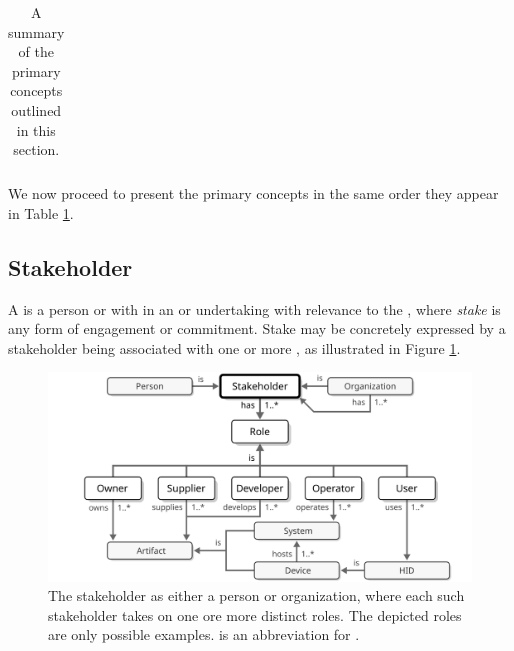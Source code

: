 \begin{table}[ht!]
\begin{tabularx}{\textwidth}{@{} p{0.2cm} p{0.7cm} p{4.3cm} X @{}}
\end{tabularx}
\caption{A summary of the primary concepts outlined in this section.}
\label{tab:concepts:summary}
\end{table}

We now proceed to present the primary concepts in the same order they appear in Table \ref{tab:concepts:summary}.

\newpage

\subsection{Stakeholder}
\label{sec:concepts:stakeholder}

A  is a person or  with  in an  or undertaking with relevance to the , where \textit{stake} is any form of engagement or commitment.
Stake may be concretely expressed by a stakeholder being associated with one or more , as illustrated in Figure \ref{fig:stakeholder}.

\begin{figure}[ht!]
  \centering
  \includegraphics[scale=0.9]{figures/stakeholder}
  \caption{
    The stakeholder as either a person or organization, where each such stakeholder takes on one ore more distinct roles.
    The depicted roles are only possible examples.
     is an abbreviation for .
  }
  \label{fig:stakeholder}
\end{figure}

